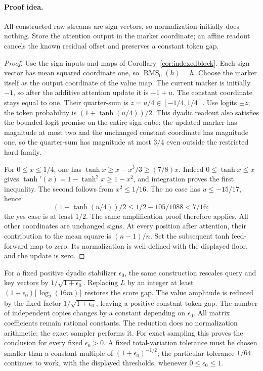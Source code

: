 \paragraph{Proof idea.}
All constructed raw streams are sign vectors, so normalization initially does nothing.  Store the attention output in the marker coordinate; an affine readout cancels the known residual offset and preserves a constant token gap.

\begin{proof}
Use the sign inputs and maps of Corollary~\ref{cor:indexedblock}.
Each sign vector has mean squared coordinate one, so
$\operatorname{RMS}_0(h)=h$.  Choose the marker itself as the output
coordinate of the value map.  The current marker is initially $-1$,
so after the additive attention update it is $-1+u$.  The constant
coordinate stays equal to one.  Their quarter-sum is
$z=u/4\in[-1/4,1/4]$.  Use logits $\pm z$; the token probability is
$(1+\tanh(u/4))/2$.  This dyadic readout also satisfies the bounded-logit
promise on the entire sign cube: the updated marker has magnitude at
most two and the unchanged constant coordinate has magnitude one,
so the quarter-sum has magnitude at most $3/4$ even outside the
restricted hard family.

For $0\le x\le1/4$, one has
$\tanh x\ge x-x^3/3\ge(7/8)x$.
Indeed $0\le\tanh x\le x$ gives
$\tanh'(x)=1-\tanh^2x\ge1-x^2$, and integration proves the first
inequality.  The second follows from $x^2\le1/16$.
The no case has $u\le-15/17$, hence
\[
 (1+\tanh(u/4))/2\le1/2-105/1088<7/16;
\]
the yes case is at least $1/2$.  The same amplification proof
therefore applies.  All other
coordinates are unchanged signs.  At every position after attention,
their contribution to the mean square is $(n-1)/n$.  Set the
subsequent tanh feed-forward map to zero.  Its normalization is
well-defined with the displayed floor, and the update is zero.
\end{proof}

For a fixed positive dyadic stabilizer $\epsilon_0$, the same construction
rescales query and key vectors by $1/\sqrt{1+\epsilon_0}$.
Replacing $L$ by an integer at least
$(1+\epsilon_0)\lceil\log_2(16m)\rceil$ restores the score gap.
The value amplitude is reduced by the fixed factor
$1/\sqrt{1+\epsilon_0}$, leaving a positive constant token gap.
The number of independent copies changes by a constant depending on
$\epsilon_0$.  All matrix coefficients remain rational constants.
The reduction does no normalization arithmetic; the exact sampler
performs it.
For exact sampling this proves the conclusion for every fixed
$\epsilon_0>0$.  A fixed total-variation tolerance must be chosen
smaller than a constant multiple of
$(1+\epsilon_0)^{-1/2}$; the particular tolerance $1/64$ continues
to work, with the displayed thresholds, whenever $0\le\epsilon_0\le1$.

